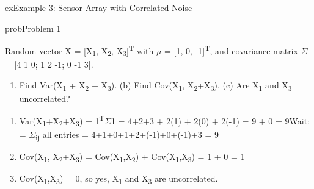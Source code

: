 \begin{PSbox}[breakable]{ex}{Example 3: Sensor Array with Correlated Noise}
\begin{Shaded}
\begin{Highlighting}[]
 \OperatorTok{=} \OperatorTok{;}
 \OperatorTok{=} \OperatorTok{\textquotesingle{}} \OperatorTok{*} \OperatorTok{;}
 \OperatorTok{=} \OperatorTok{\^{}} \OperatorTok{/}\NormalTok{ (}\OperatorTok{\textquotesingle{}*}\OperatorTok{*}\NormalTok{)}\OperatorTok{;}
\NormalTok{(}\OperatorTok{,} \OperatorTok{,} \OperatorTok{*}\NormalTok{(}\NormalTok{))}\OperatorTok{;}
\end{Highlighting}
\end{Shaded}

\end{PSbox}


\begin{PSbox}[unbreakable]{prob}{Problem 1}

Random vector X = [X\textsubscript{1}, X\textsubscript{2}, X\textsubscript{3}]\textsuperscript{T} with \ensuremath{\mu} = [1, 0, -1]\textsuperscript{T}, and covariance matrix \ensuremath{\Sigma} = [4 1 0; 1 2 -1; 0 -1 3].

\begin{enumerate}
\def\labelenumi{(\alph{enumi})}
\tightlist
\item
  Find Var(X\textsubscript{1} + X\textsubscript{2} + X\textsubscript{3}). (b) Find Cov(X\textsubscript{1}, X\textsubscript{2}+X\textsubscript{3}). (c) Are X\textsubscript{1} and X\textsubscript{3} uncorrelated?
\end{enumerate}

\PSsolution{} 

\begin{enumerate}
\def\labelenumi{(\alph{enumi})}
\tightlist
\item
  Var(X\textsubscript{1}+X\textsubscript{2}+X\textsubscript{3}) = 1\textsuperscript{T}\ensuremath{\Sigma}1 = 4+2+3 + 2(1) + 2(0) + 2(-1) = 9 + 0 = 9\PSbr{}Wait: = \ensuremath{\Sigma}\textsubscript{ij} all entries = 4+1+0+1+2+(-1)+0+(-1)+3 = 9
\item
  Cov(X\textsubscript{1}, X\textsubscript{2}+X\textsubscript{3}) = Cov(X\textsubscript{1},X\textsubscript{2}) + Cov(X\textsubscript{1},X\textsubscript{3}) = 1 + 0 = 1
\item
  Cov(X\textsubscript{1},X\textsubscript{3}) = 0, so yes, X\textsubscript{1} and X\textsubscript{3} are uncorrelated.
\end{enumerate}

\end{PSbox}

